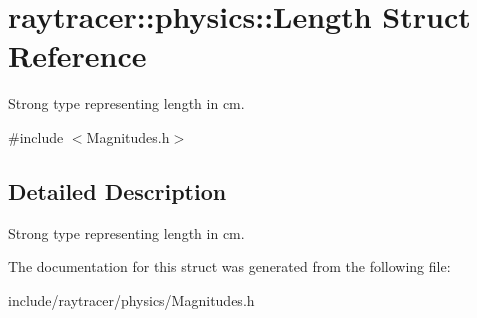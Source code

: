 \hypertarget{structraytracer_1_1physics_1_1Length}{}\section{raytracer\+:\+:physics\+:\+:Length Struct Reference}
\label{structraytracer_1_1physics_1_1Length}


Strong type representing length in cm.  




{\ttfamily \#include $<$Magnitudes.\+h$>$}



\subsection{Detailed Description}
Strong type representing length in cm. 



The documentation for this struct was generated from the following file\+:\begin{DoxyCompactItemize}
\item 
include/raytracer/physics/Magnitudes.\+h\end{DoxyCompactItemize}
